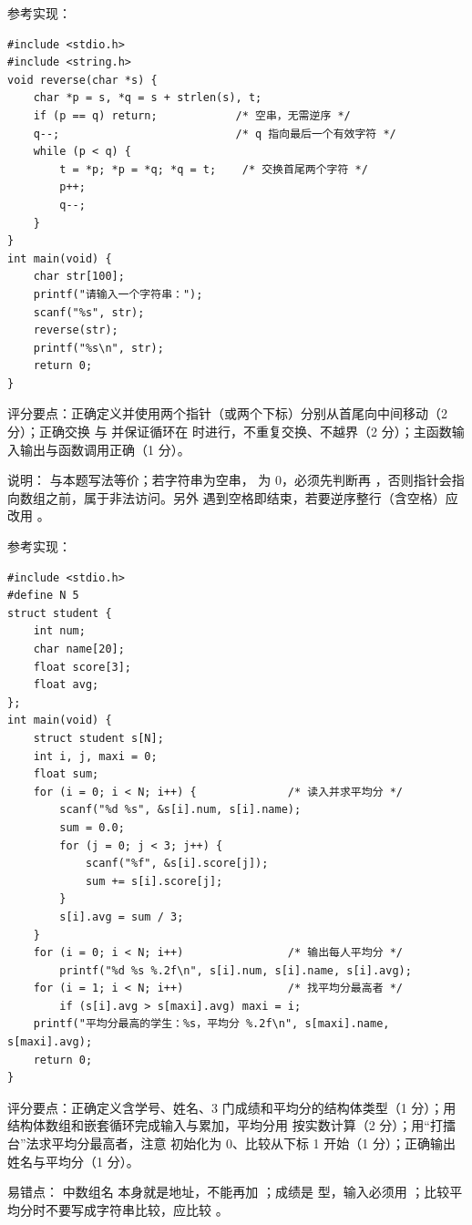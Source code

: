 \documentclass[a4paper,11pt]{article}
\begin{document}
\begin{qgroup}
\q 参考实现：
\begin{lstlisting}[language={[custom]C}]
#include <stdio.h>
#include <string.h>
void reverse(char *s) {
    char *p = s, *q = s + strlen(s), t;
    if (p == q) return;            /* 空串，无需逆序 */
    q--;                           /* q 指向最后一个有效字符 */
    while (p < q) {
        t = *p; *p = *q; *q = t;    /* 交换首尾两个字符 */
        p++;
        q--;
    }
}
int main(void) {
    char str[100];
    printf("请输入一个字符串：");
    scanf("%s", str);
    reverse(str);
    printf("%s\n", str);
    return 0;
}
\end{lstlisting}
\begin{analysis}
评分要点：正确定义并使用两个指针（或两个下标）分别从首尾向中间移动（2 分）；正确交换  与  并保证循环在  时进行，不重复交换、不越界（2 分）；主函数输入输出与函数调用正确（1 分）。
\end{analysis}
\begin{analysis}
说明： 与本题写法等价；若字符串为空串， 为 0，必须先判断再 ，否则指针会指向数组之前，属于非法访问。另外  遇到空格即结束，若要逆序整行（含空格）应改用 。
\end{analysis}

\q 参考实现：
\begin{lstlisting}[language={[custom]C}]
#include <stdio.h>
#define N 5
struct student {
    int num;
    char name[20];
    float score[3];
    float avg;
};
int main(void) {
    struct student s[N];
    int i, j, maxi = 0;
    float sum;
    for (i = 0; i < N; i++) {              /* 读入并求平均分 */
        scanf("%d %s", &s[i].num, s[i].name);
        sum = 0.0;
        for (j = 0; j < 3; j++) {
            scanf("%f", &s[i].score[j]);
            sum += s[i].score[j];
        }
        s[i].avg = sum / 3;
    }
    for (i = 0; i < N; i++)                /* 输出每人平均分 */
        printf("%d %s %.2f\n", s[i].num, s[i].name, s[i].avg);
    for (i = 1; i < N; i++)                /* 找平均分最高者 */
        if (s[i].avg > s[maxi].avg) maxi = i;
    printf("平均分最高的学生：%s，平均分 %.2f\n", s[maxi].name, s[maxi].avg);
    return 0;
}
\end{lstlisting}
\begin{analysis}
评分要点：正确定义含学号、姓名、3 门成绩和平均分的结构体类型（1 分）；用结构体数组和嵌套循环完成输入与累加，平均分用  按实数计算（2 分）；用“打擂台”法求平均分最高者，注意  初始化为 0、比较从下标 1 开始（1 分）；正确输出姓名与平均分（1 分）。
\end{analysis}
\begin{analysis}
易错点： 中数组名  本身就是地址，不能再加 \code{\&}；成绩是  型，输入必须用 ；比较平均分时不要写成字符串比较，应比较 。
\end{analysis}
\end{qgroup}
\end{document}
